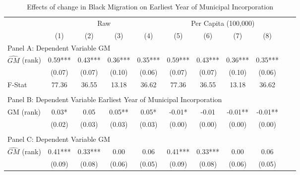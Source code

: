  \begin{table}[htbp]\centering {} \begin{threeparttable} \caption{Effects of change in Black Migration on Earliest Year of Municipal Incorporation} \begin{tabular}{l*{10}{c}} \toprule
                &\multicolumn{4}{c}{Raw}                                    &\multicolumn{4}{c}{Per Capita (100,000)}                   \\\cmidrule(lr){2-5}\cmidrule(lr){6-9}
                &\multicolumn{1}{c}{(1)}   &\multicolumn{1}{c}{(2)}   &\multicolumn{1}{c}{(3)}   &\multicolumn{1}{c}{(4)}   &\multicolumn{1}{c}{(5)}   &\multicolumn{1}{c}{(6)}   &\multicolumn{1}{c}{(7)}   &\multicolumn{1}{c}{(8)}   \\
\cmidrule(lr){1-9}
\multicolumn{8}{l}{Panel A: Dependent Variable GM}\\
\cmidrule(lr){1-9}
$\hat{GM}$ (rank)&       0.59***&       0.43***&       0.36***&       0.35***&       0.59***&       0.43***&       0.36***&       0.35***\\
                &     (0.07)   &     (0.07)   &     (0.10)   &     (0.06)   &     (0.07)   &     (0.07)   &     (0.10)   &     (0.06)   \\
\midrule
F-Stat          &      77.36   &      36.55   &      13.18   &      36.62   &      77.36   &      36.55   &      13.18   &      36.62   \\
\cmidrule[\heavyrulewidth](lr){1-9} \\ \cmidrule[\heavyrulewidth](lr){1-9}
\multicolumn{8}{l}{Panel B: Dependent Variable Earliest Year of Municipal Incorporation}\\
\cmidrule(lr){1-9}
GM  (rank)      &       0.03*  &       0.05   &       0.05** &       0.05*  &      -0.01*  &      -0.01   &      -0.01** &      -0.01** \\
                &     (0.02)   &     (0.03)   &     (0.03)   &     (0.03)   &     (0.00)   &     (0.00)   &     (0.00)   &     (0.00)   \\
\cmidrule[\heavyrulewidth](lr){1-9} \\ \cmidrule[\heavyrulewidth](lr){1-9}
\multicolumn{8}{l}{Panel C: Dependent Variable GM}\\
\cmidrule(lr){1-9}
$\hat{GM}$ (rank)&       0.41***&       0.33***&       0.00   &       0.06   &       0.41***&       0.33***&       0.00   &       0.06   \\
                &     (0.09)   &     (0.08)   &     (0.06)   &     (0.05)   &     (0.09)   &     (0.08)   &     (0.06)   &     (0.05)   \\

\end{tabular}
\end{threeparttable}
\end{table}

